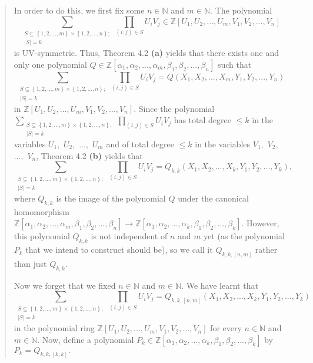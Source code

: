 \documentclass[numbers=enddot,12pt,final,onecolumn,notitlepage]{scrartcl}%
\begin{document}
\begin{quote}
In order to do this, we first fix some $n\in\mathbb{N}$ and $m\in\mathbb{N}$.
The polynomial%
\[
\sum_{\substack{S\subseteq\left\{  1,2,...,m\right\}  \times\left\{
1,2,...,n\right\}  ;\\\left\vert S\right\vert =k}}\prod_{\left(  i,j\right)
\in S}U_{i}V_{j}\in\mathbb{Z}\left[  U_{1},U_{2},...,U_{m},V_{1}%
,V_{2},...,V_{n}\right]
\]
is UV-symmetric. Thus, Theorem 4.2 \textbf{(a)} yields that there exists one
and only one polynomial $Q\in\mathbb{Z}\left[  \alpha_{1},\alpha
_{2},...,\alpha_{m},\beta_{1},\beta_{2},...,\beta_{n}\right]  $ such that%
\[
\sum_{\substack{S\subseteq\left\{  1,2,...,m\right\}  \times\left\{
1,2,...,n\right\}  ;\\\left\vert S\right\vert =k}}\prod_{\left(  i,j\right)
\in S}U_{i}V_{j}=Q\left(  X_{1},X_{2},...,X_{m},Y_{1},Y_{2},...,Y_{n}\right)
\]
in $\mathbb{Z}\left[  U_{1},U_{2},...,U_{m},V_{1},V_{2},...,V_{n}\right]  $.
Since the polynomial $\sum\limits_{\substack{S\subseteq\left\{
1,2,...,m\right\}  \times\left\{  1,2,...,n\right\}  ;\\\left\vert
S\right\vert =k}}\prod\limits_{\left(  i,j\right)  \in S}U_{i}V_{j}$ has total
degree $\leq k$ in the variables $U_{1},$ $U_{2},$ $...,$ $U_{m}$ and of total
degree $\leq k$ in the variables $V_{1},$ $V_{2},$ $...,$ $V_{n}$, Theorem 4.2
\textbf{(b)} yields that%
\[
\sum_{\substack{S\subseteq\left\{  1,2,...,m\right\}  \times\left\{
1,2,...,n\right\}  ;\\\left\vert S\right\vert =k}}\prod_{\left(  i,j\right)
\in S}U_{i}V_{j}=Q_{k,k}\left(  X_{1},X_{2},...,X_{k},Y_{1},Y_{2}%
,...,Y_{k}\right)  ,
\]
where $Q_{k,k}$ is the image of the polynomial $Q$ under the canonical
homomorphism $\mathbb{Z}\left[  \alpha_{1},\alpha_{2},...,\alpha_{m},\beta
_{1},\beta_{2},...,\beta_{n}\right]  \rightarrow\mathbb{Z}\left[  \alpha
_{1},\alpha_{2},...,\alpha_{k},\beta_{1},\beta_{2},...,\beta_{k}\right]  $.
However, this polynomial $Q_{k,k}$ is not independent of $n$ and $m$ yet (as
the polynomial $P_{k}$ that we intend to construct should be), so we call it
$Q_{k,k,\left[  n,m\right]  }$ rather than just $Q_{k,k}$.

Now we forget that we fixed $n\in\mathbb{N}$ and $m\in\mathbb{N}$. We have
learnt that%
\[
\sum_{\substack{S\subseteq\left\{  1,2,...,m\right\}  \times\left\{
1,2,...,n\right\}  ;\\\left\vert S\right\vert =k}}\prod_{\left(  i,j\right)
\in S}U_{i}V_{j}=Q_{k,k,\left[  n,m\right]  }\left(  X_{1},X_{2}%
,...,X_{k},Y_{1},Y_{2},...,Y_{k}\right)
\]
in the polynomial ring $\mathbb{Z}\left[  U_{1},U_{2},...,U_{m},V_{1}%
,V_{2},...,V_{n}\right]  $ for every $n\in\mathbb{N}$ and $m\in\mathbb{N}$.
Now, define a polynomial $P_{k}\in\mathbb{Z}\left[  \alpha_{1},\alpha
_{2},...,\alpha_{k},\beta_{1},\beta_{2},...,\beta_{k}\right]  $ by
$P_{k}=Q_{k,k,\left[  k,k\right]  }.$


\end{quote}
\end{document}
